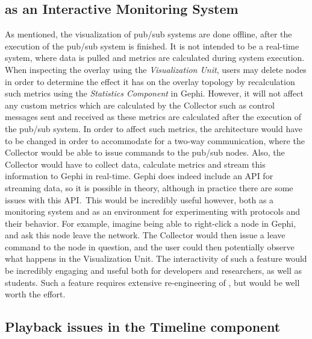 \subsection{\demo{} as an Interactive Monitoring System}

As mentioned, the visualization of pub/sub systems are done offline,
after the execution of the pub/sub system is finished. It is not
intended to be a real-time system, where data is pulled and metrics are
calculated during system execution. When inspecting the overlay using
the \emph{Visualization Unit}, users may delete nodes in order to
determine the effect it has on the overlay topology by recalculation
such metrics using the \emph{Statistics Component} in Gephi. However, it will
not affect any custom metrics which are calculated by the Collector such
as control messages sent and received as these metrics are calculated
after the execution of the pub/sub system. In order to affect such
metrics, the architecture would have to be changed in order to
accommodate for a two-way communication, where the Collector would be
able to issue commands to the pub/sub nodes. Also, the Collector would
have to collect data, calculate metrics and stream this information to
Gephi in real-time. Gephi does indeed include an API for streaming data,
so it is possible in theory, although in practice there are some issues
with this API.\ This would be incredibly useful however, both as a
monitoring system and as an environment for experimenting with protocols
and their behavior. For example, imagine being able to right-click a
node in Gephi, and ask this node leave the network. The Collector would
then issue a leave command to the node in question, and the user could
then potentially observe what happens in the Visualization Unit. The
interactivity of such a feature would be incredibly engaging and useful
both for developers and researchers, as well as students. Such
a feature requires extensive re-engineering of \demo{}, but would be
well worth the effort.

\subsection{Playback issues in the Timeline component}

